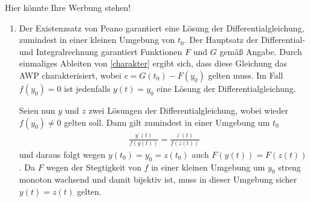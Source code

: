 \begin{solution}
    Hier könnte Ihre Werbung stehen!
    \begin{enumerate}[label = \alph*)]
        \item Der Existenzsatz von Peano garantiert eine Lösung der Differentialgleichung, zumindest in einer kleinen Umgebung von $t_0$. Der Hauptsatz der Differential- und Integralrechnung garantiert Funktionen $F$ und $G$ gemäß Angabe. Durch einmaliges Ableiten von \eqref{charakter} ergibt sich, dass diese Gleichung das AWP charakterisiert, wobei $c = G(t_0) - F(y_0)$ gelten muss. Im Fall $f(y_0) = 0$ ist jedenfalls $y(t) = y_0$ eine Lösung der Differentialgleichung.
        
        Seien nun $y$ und $z$ zwei Lösungen der Differentialgleichung, wobei wieder $f(y_0) \neq 0$ gelten soll. Dann gilt zumindest in einer Umgebung um $t_0$
        \begin{align*}
            \frac{y^\prime(t)}{f(y(t))} = \frac{z^\prime(t)}{f(z(t))}
        \end{align*}
        und daraus folgt wegen $y(t_0) = y_0 = z(t_0)$ auch $F(y(t)) = F(z(t))$. Da $F$ wegen der Stegtigkeit von $f$ in einer kleinen Umgebung um $y_0$ streng monoton wachsend und damit bijektiv ist, muss in dieser Umgebung sicher $y(t) = z(t)$ gelten.
        

\end{enumerate}
\end{solution}
